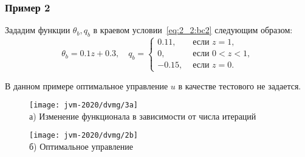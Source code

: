 \begin{frame}
    \frametitle{Пример 2}
    Зададим функции $\theta_{b}, q_{b}$ в краевом условии~\eqref{eq:2_2:bc2}
    следующим образом:
    \[
        \theta_{b}=0.1 z+0.3, \quad q_{b}=
        \begin{cases}
            0.11, & \text { если } z=1, \\
            0, & \text { если } 0<z<1, \\
            -0.15, & \text { если } z=0.
        \end{cases}
    \]

    В данном примере оптимальное управление $u$ в качестве тестового не задается.

    \begin{figure}[h!t]
        \begin{minipage}[b][][b]{0.49\linewidth}
            \centering
            \texttt{[image: jvm-2020/dvmg/3a]}
            \\ а) Изменение функционала в зависимости от числа итераций
        \end{minipage}
        \hfill
        \begin{minipage}[b][][b]{0.49\linewidth}
            \centering
            \texttt{[image: jvm-2020/dvmg/2b]}
            \\ б) Оптимальное управление
        \end{minipage}
        \label{fig:4_4:3}
    \end{figure}

\end{frame}

